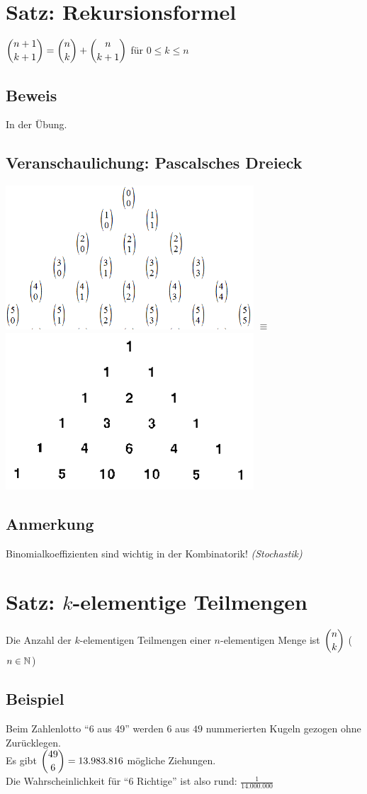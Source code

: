 \section{Satz: Rekursionsformel}\label{2.8}
$\displaystyle\binom{n+1}{k+1} = \displaystyle\binom{n}{k} + \displaystyle\binom{n}{k+1}$ für $0 \le k \le n$

\subsection*{Beweis}
In der Übung.

\subsection*{Veranschaulichung: Pascalsches Dreieck}
\includegraphics[scale=0.5]{img/2013-10-17/1} $\equiv$ \includegraphics[scale=0.5]{img/2013-10-17/2}

\subsection*{Anmerkung}
Binomialkoeffizienten sind wichtig in der Kombinatorik! \emph{(Stochastik)}

\section{\texorpdfstring{Satz: $k$-elementige Teilmengen}{Satz: k-elementige Teilmengen}}\label{2.9}
Die Anzahl der $k$-elementigen Teilmengen einer $n$-elementigen Menge ist $\displaystyle\binom{n}{k}$ ($n \in \mathbb{N}$)

\subsection*{Beispiel}
Beim Zahlenlotto ``6 aus 49'' werden $6$ aus $49$ nummerierten Kugeln gezogen ohne Zurücklegen.\\
Es gibt $\displaystyle\binom{49}{6} = 13.983.816$ mögliche Ziehungen.\\
Die Wahrscheinlichkeit für ``6 Richtige'' ist also rund: $\frac{1}{14.000.000}$